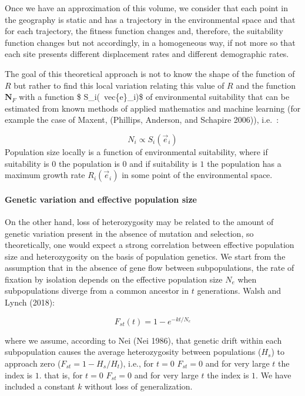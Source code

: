 \documentclass[
]{article}
\begin{document}
Once we have an approximation of this volume, we consider that each
point in the geography is static and has a trajectory in the
environmental space and that for each trajectory, the fitness function
changes and, therefore, the suitability function changes but not
accordingly, in a homogeneous way, if not more so that each site
presents different displacement rates and different demographic rates.

The goal of this theoretical approach is not to know the shape of the
function of \(R\) but rather to find this local variation relating this
value of \(R\) and the function \(\mathbf{N}_F\) with a function \$
S\_i(~vec\{e\}\_i)\$ of environmental suitability that can be estimated
from known methods of applied mathematics and machine learning (for
example the case of Maxent, (Phillips, Anderson, and Schapire 2006)),
i.e.~:

\[
N_i \propto  S_i(\vec{e}_i)
\] Population size locally is a function of environmental suitability,
where if suitability is \(0\) the population is \(0\) and if suitability
is \(1\) the population has a maximum growth rate \(R_i(\vec{e}_i)\) in
some point of the environmental space.

\hypertarget{genetic-variation-and-effective-population-size}{%
\paragraph{Genetic variation and effective population
size}\label{genetic-variation-and-effective-population-size}}

On the other hand, loss of heterozygosity may be related to the amount
of genetic variation present in the absence of mutation and selection,
so theoretically, one would expect a strong correlation between
effective population size and heterozygosity on the basis of population
genetics. We start from the assumption that in the absence of gene flow
between subpopulations, the rate of fixation by isolation depends on the
effective population size \(N_e\) when subpopulations diverge from a
common ancestor in \(t\) generations. Walsh and Lynch (2018):

\[
F_{st}(t) = 1 - e^{-kt/N_e } 
\]

where we assume, according to Nei (Nei 1986), that genetic drift within
each subpopulation causes the average heterozygosity between populations
(\(H_s\)) to approach zero (\(F_{st} = 1 - H_s/H_t\)), i.e., for \(t=0\)
\(F_{st} = 0\) and for very large \(t\) the index is \(1\). that is, for
\(t=0\) \(F_{st} = 0\) and for very large \(t\) the index is \(1\). We
have included a constant \(k\) without loss of generalization.
\end{document}
